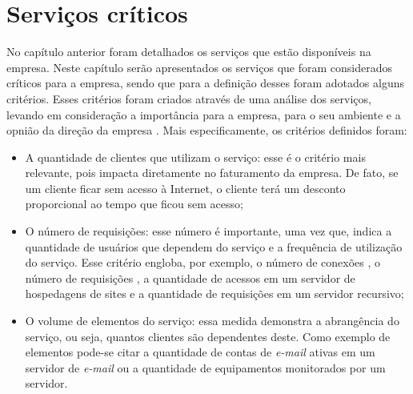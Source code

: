 \chapter{Serviços críticos}
\label{cap:servicoscriticos}

No capítulo anterior foram detalhados os serviços que estão disponíveis na empresa. Neste capítulo serão apresentados os serviços 
que foram considerados críticos para a empresa, sendo que para a definição desses foram adotados alguns critérios. Esses critérios foram criados
através de uma análise dos serviços, levando em consideração a importância para a empresa, para o seu ambiente e a opnião da direção da empresa
\citet{geordano2014}. Mais especificamente, os critérios definidos foram:


\begin{itemize}
 \item A quantidade de clientes que utilizam o serviço: esse é o critério mais relevante, pois impacta diretamente no faturamento
 da empresa. De fato, se um cliente ficar sem acesso à Internet, o cliente terá um desconto proporcional ao tempo que ficou sem 
 acesso; 
 \item O número de requisições: esse número é importante, uma vez que, indica a quantidade de usuários que dependem do serviço e a frequência
 de utilização do serviço. Esse critério engloba, por exemplo, o número de conexões , o número de requisições 
 , a quantidade de acessos em um servidor de hospedagens de sites e a quantidade de requisições  
 em um servidor recursivo;
 \item O volume de elementos do serviço: essa medida demonstra a abrangência do serviço, ou seja, quantos clientes são dependentes deste. 
 Como exemplo de elementos pode-se citar a quantidade de contas de \textit{e-mail} ativas em um servidor de \textit{e-mail} ou a quantidade de 
 equipamentos monitorados por um servidor.
\end{itemize}


